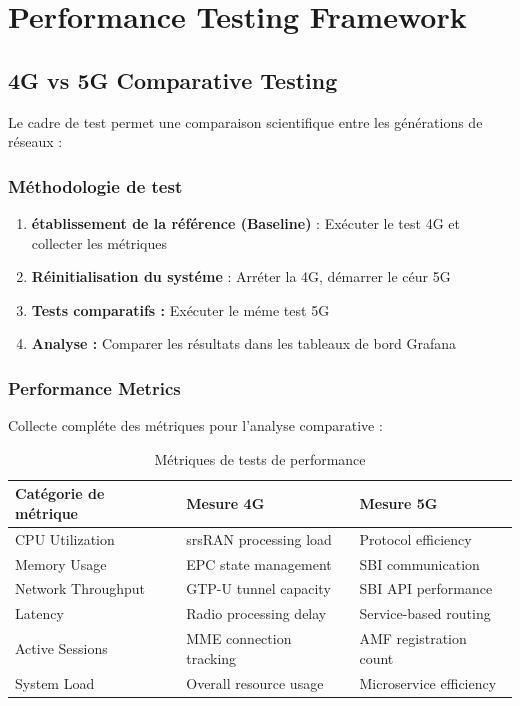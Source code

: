 \documentclass[12pt,a4paper]{report}
\begin{document}
\section{Performance Testing Framework}

\subsection{4G vs 5G Comparative Testing}

Le cadre de test permet une comparaison scientifique entre les générations de réseaux :

\subsubsection{Méthodologie de test}

\begin{enumerate}
    \item \textbf{établissement de la référence (Baseline)} : Exécuter le test 4G et collecter les métriques
    \item \textbf{Réinitialisation du systéme} : Arréter la 4G, démarrer le céur 5G
    \item \textbf{Tests comparatifs :} Exécuter le méme test 5G
    \item \textbf{Analyse :} Comparer les résultats dans les tableaux de bord Grafana
\end{enumerate}

\subsubsection{Performance Metrics}

Collecte compléte des métriques pour l'analyse comparative :

\begin{table}[H]
\centering
\caption{Métriques de tests de performance}
\label{tab:performance-metrics}
\begin{tabular}{@{}lll@{}}
\toprule
Catégorie de métrique & Mesure 4G & Mesure 5G \\
\midrule
CPU Utilization & srsRAN processing load & Protocol efficiency \\
Memory Usage & EPC state management & SBI communication \\
Network Throughput & GTP-U tunnel capacity & SBI API performance \\
Latency & Radio processing delay & Service-based routing \\
Active Sessions & MME connection tracking & AMF registration count \\
System Load & Overall resource usage & Microservice efficiency \\
\bottomrule
\end{tabular}
\end{table}
\end{document}
